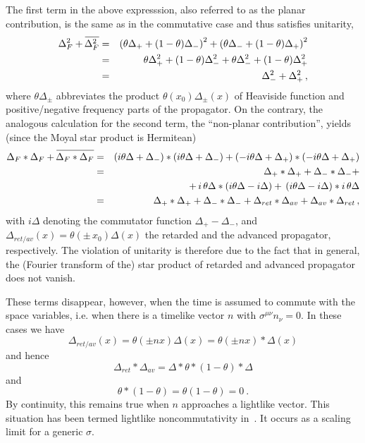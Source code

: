 \documentclass[a4paper,twoside,12pt]{article}
\begin{document}
The first term in the above expresssion, also referred to as the planar
contribution, is the same as in the commutative case and thus satisfies
unitarity,
\begin{eqnarray}\label{uni}
\Delta_F^2+\overline{\phantom{\big|}\hspace{-4pt}\Delta_F^2}
&=&
\left(\theta\Delta_+ +(1-\theta)\Delta_-\right)^2
+\left(\theta \Delta_- +(1-\theta)\Delta_+\right)^2\nonumber\\
&=&\theta \Delta_+^2 +(1-\theta)\Delta_-^2
+\theta \Delta_-^2 +(1-\theta)\Delta_+^2\nonumber\\
&=&\Delta_-^2+\Delta_+^2\,,
\end{eqnarray}
where $\theta\Delta_\pm$ abbreviates the product $\theta(x_0) \Delta_\pm(x)$ of
Heaviside function and positive/negative frequency parts of the propagator. On the contrary, the analogous calculation for the second term, the ``non-planar
contribution'', yields (since the Moyal star product is Hermitean)
\begin{eqnarray}\label{nonunistar}
\Delta_F*\Delta_F +
\overline{\phantom{\big|}\hspace{-4pt}\Delta_F*
\Delta_F} 
&=&
\left(i\theta\Delta +\Delta_-\right)
*\left(i\theta\Delta +\Delta_-\right)
+\left(-i\theta \Delta +\Delta_+\right)
*\left(-i\theta \Delta +\Delta_+\right)\nonumber\\
&=&\Delta_+*\Delta_++\Delta_-*\Delta_- +
\nonumber \\&&+\,
i\,\theta\Delta*(i\theta\Delta-i\Delta)
+\,(i\theta\Delta-i\Delta)* i\,\theta\Delta
\nonumber\\
&=&\Delta_+*\Delta_++\Delta_-*\Delta_- +
\Delta_{ret}*\Delta_{av}
+\Delta_{av}* \Delta_{ret}\,,
\end{eqnarray}
with $i\Delta$ denoting the commutator function $\Delta_+-\Delta_-$, and 
$\Delta_{ret/ av}(x)=\theta(\pm\, x_0)\Delta(x)$ the retarded and the advanced
propagator, respectively. The violation of unitarity is therefore due to the
fact that in general, the (Fourier transform of the) star product of retarded
and advanced propagator does not vanish. 

These terms disappear, however, when the time is assumed to commute with
the space variables, 
i.e. when there is a timelike vector 
$n$ with $\sigma^{\mu\nu}n_{\nu}=0$. In these cases we have
$$
\Delta_{ret/av}(x)=\theta(\pm nx)\Delta(x)=\theta(\pm nx)*\Delta(x)
$$
and hence 
$$
\Delta_{ret}*\Delta_{av}=\Delta*\theta*(1-\theta)*\Delta
$$
and
$$
\theta*(1-\theta)=\theta(1-\theta)=0 \ .
$$
By continuity, this remains true when $n$ approaches a 
lightlike vector. This situation has been termed lightlike 
noncommutativity in~\cite{gomis2}. It occurs as a scaling limit 
for a generic $\sigma$. 
\end{document}

